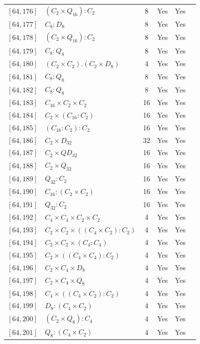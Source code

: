 \documentclass[12pt, a4paper]{article}
\theoremstyle{plain}
\theoremstyle{definition}
\begin{document}
\begin{longtable}{llcccl}
  $[64,176]$ & $(C_2 \times Q_{16}) : C_2$ & 8 & Yes & Yes \\
  $[64,177]$ & $C_8 : D_8$ & 8 & Yes & Yes \\
  $[64,178]$ & $(C_2 \times Q_{16}) : C_2$ & 8 & Yes & Yes \\
  $[64,179]$ & $C_8 : Q_8$ & 8 & Yes & Yes \\
  $[64,180]$ & $(C_2 \times C_2) . (C_2 \times D_8)$ & 4 & Yes & Yes \\
  $[64,181]$ & $C_8 : Q_8$ & 8 & Yes & Yes \\
  $[64,182]$ & $C_8 : Q_8$ & 8 & Yes & Yes \\
  $[64,183]$ & $C_{16} \times C_2 \times C_2$ & 16 & Yes & Yes \\
  $[64,184]$ & $C_2 \times (C_{16} : C_2)$ & 16 & Yes & Yes \\
  $[64,185]$ & $(C_{16} : C_2) : C_2$ & 16 & Yes & Yes \\
  $[64,186]$ & $C_2 \times D_{32}$ & 32 & Yes & Yes \\
  $[64,187]$ & $C_2 \times QD_{32}$ & 16 & Yes & Yes \\
  $[64,188]$ & $C_2 \times Q_{32}$ & 16 & Yes & Yes \\
  $[64,189]$ & $Q_{32} : C_2$ & 16 & Yes & Yes \\
  $[64,190]$ & $C_{16} : (C_2 \times C_2)$ & 16 & Yes & Yes \\
  $[64,191]$ & $Q_{32} : C_2$ & 16 & Yes & Yes \\
  $[64,192]$ & $C_4 \times C_4 \times C_2 \times C_2$ & 4 & Yes & Yes \\
  $[64,193]$ & $C_2 \times C_2 \times ((C_4 \times C_2) : C_2)$ & 4 & Yes & Yes \\
  $[64,194]$ & $C_2 \times C_2 \times (C_4 : C_4)$ & 4 & Yes & Yes \\
  $[64,195]$ & $C_2 \times ((C_4 \times C_4) : C_2)$ & 4 & Yes & Yes \\
  $[64,196]$ & $C_2 \times C_4 \times D_8$ & 4 & Yes & Yes \\
  $[64,197]$ & $C_2 \times C_4 \times Q_8$ & 4 & Yes & Yes \\
  $[64,198]$ & $C_4 \times ((C_4 \times C_2) : C_2)$ & 4 & Yes & Yes \\
  $[64,199]$ & $D_8 : (C_4 \times C_2)$ & 4 & Yes & Yes \\
  $[64,200]$ & $(C_2 \times Q_8) : C_4$ & 4 & Yes & Yes \\
  $[64,201]$ & $Q_8 : (C_4 \times C_2)$ & 4 & Yes & Yes \\

\end{longtable}
\end{document}

